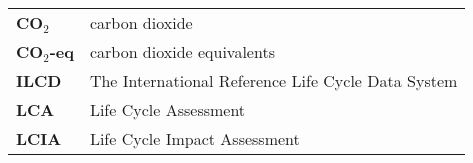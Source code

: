 
\begin{table}[h!]
\begin{tabular}{ll}
\textbf{CO$_2$}     & carbon dioxide               \\
\textbf{CO$_2$-eq} & carbon dioxide equivalents   \\
\textbf{ILCD}        & The International Reference Life Cycle Data System   \\
\textbf{LCA}        & Life Cycle Assessment        \\
\textbf{LCIA}       & Life Cycle Impact Assessment
\end{tabular}
\end{table}
